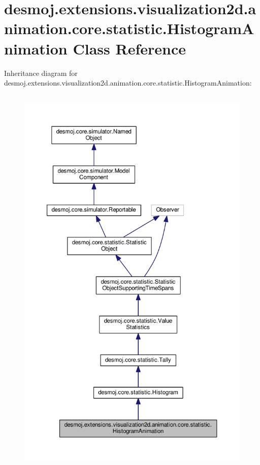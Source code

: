\section{desmoj.\-extensions.\-visualization2d.\-animation.\-core.\-statistic.\-Histogram\-Animation Class Reference}
\label{classdesmoj_1_1extensions_1_1visualization2d_1_1animation_1_1core_1_1statistic_1_1_histogram_animation}


Inheritance diagram for desmoj.\-extensions.\-visualization2d.\-animation.\-core.\-statistic.\-Histogram\-Animation\-:
\nopagebreak
\begin{figure}[H]
\begin{center}
\leavevmode
\includegraphics[height=550pt]{classdesmoj_1_1extensions_1_1visualization2d_1_1animation_1_1core_1_1statistic_1_1_histogram_animation__inherit__graph}
\end{center}
\end{figure}


